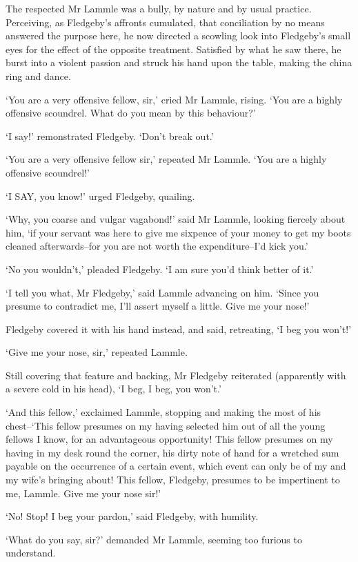 The respected Mr Lammle was a bully, by nature and by usual practice.
Perceiving, as Fledgeby’s affronts cumulated, that conciliation by no
means answered the purpose here, he now directed a scowling look
into Fledgeby’s small eyes for the effect of the opposite treatment.
Satisfied by what he saw there, he burst into a violent passion and
struck his hand upon the table, making the china ring and dance.

‘You are a very offensive fellow, sir,’ cried Mr Lammle, rising. ‘You
are a highly offensive scoundrel. What do you mean by this behaviour?’

‘I say!’ remonstrated Fledgeby. ‘Don’t break out.’

‘You are a very offensive fellow sir,’ repeated Mr Lammle. ‘You are a
highly offensive scoundrel!’

‘I SAY, you know!’ urged Fledgeby, quailing.

‘Why, you coarse and vulgar vagabond!’ said Mr Lammle, looking fiercely
about him, ‘if your servant was here to give me sixpence of your
money to get my boots cleaned afterwards--for you are not worth the
expenditure--I’d kick you.’

‘No you wouldn’t,’ pleaded Fledgeby. ‘I am sure you’d think better of
it.’

‘I tell you what, Mr Fledgeby,’ said Lammle advancing on him. ‘Since
you presume to contradict me, I’ll assert myself a little. Give me your
nose!’

Fledgeby covered it with his hand instead, and said, retreating, ‘I beg
you won’t!’

‘Give me your nose, sir,’ repeated Lammle.

Still covering that feature and backing, Mr Fledgeby reiterated
(apparently with a severe cold in his head), ‘I beg, I beg, you won’t.’

‘And this fellow,’ exclaimed Lammle, stopping and making the most of his
chest--‘This fellow presumes on my having selected him out of all the
young fellows I know, for an advantageous opportunity! This fellow
presumes on my having in my desk round the corner, his dirty note of
hand for a wretched sum payable on the occurrence of a certain event,
which event can only be of my and my wife’s bringing about! This fellow,
Fledgeby, presumes to be impertinent to me, Lammle. Give me your nose
sir!’

‘No! Stop! I beg your pardon,’ said Fledgeby, with humility.

‘What do you say, sir?’ demanded Mr Lammle, seeming too furious to
understand.

